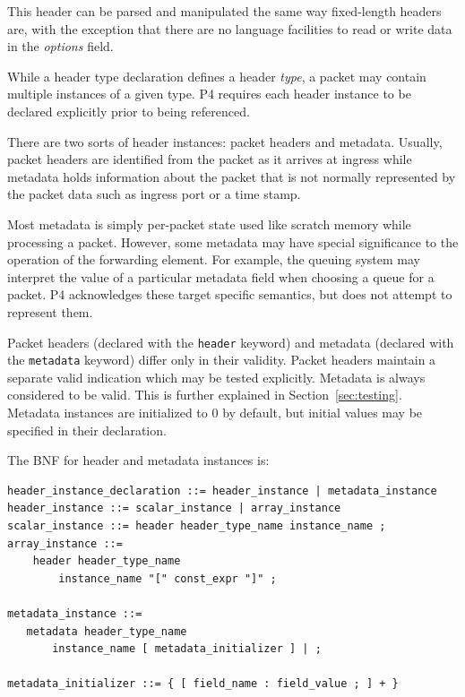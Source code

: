 \documentclass[12pt]{article}
\begin{document}
This header can be parsed and manipulated the same way fixed-length headers
are, with the exception that there are no language facilities to read or
write data in the \textit{options} field.


While a header type declaration defines a header \textit{type}, a packet may contain 
multiple instances of a given type.  P4 requires each header instance to 
be declared explicitly prior to being referenced. 

There are two sorts of header instances: packet headers and metadata. Usually, 
packet headers are identified from the packet as it arrives at ingress while 
metadata holds information about the packet that is not normally represented 
by the packet data such as ingress port or a time stamp.  

Most metadata is simply per-packet state used like scratch memory while
processing a packet. However, some metadata may have special significance to
the operation  of the forwarding element. For example, the queuing system may
interpret the value of a particular metadata field when choosing a queue for a
packet. P4 acknowledges these target specific semantics, but does not attempt
to represent them.

Packet headers (declared with the \texttt{header} keyword) and metadata (declared 
with the \texttt{metadata} keyword) differ only in their validity. Packet headers 
maintain a separate valid indication which may be tested explicitly. Metadata 
is always considered to be valid. This is further explained in 
Section~\ref{sec:testing}.  Metadata instances are 
initialized to 0 by default, but initial values may be specified in their 
declaration.

The BNF for header and metadata instances is:

\begin{lstlisting}[style=BNFstyle]
header_instance_declaration ::= header_instance | metadata_instance
header_instance ::= scalar_instance | array_instance
scalar_instance ::= header header_type_name instance_name ;
array_instance ::=
    header header_type_name 
        instance_name "[" const_expr "]" ;

metadata_instance ::= 
   metadata header_type_name
       instance_name [ metadata_initializer ] | ;

metadata_initializer ::= { [ field_name : field_value ; ] + }
\end{lstlisting}
\end{document}
